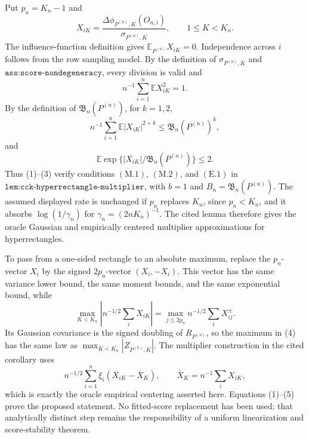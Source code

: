 Put \(p_n=K_n-1\) and
\[
 X_{iK}=\frac{\Delta\phi_{P^{(n)},K}(O_{n,i})}{\sigma_{P^{(n)},K}},
 \qquad 1\leq K<K_n.
\]
The influence-function definition gives \(\mathbb E_{P^{(n)}}X_{iK}=0\).  Independence across \(i\) follows from the row sampling model.  By the definition of \(\sigma_{P^{(n)},K}\) and 
\(\texttt{ass:score-nondegeneracy}\), every division is valid and
\[
 n^{-1}\sum_{i=1}^n\mathbb E X_{iK}^2=1.                                      \tag{1}
\]
By the definition of \(\mathfrak B_n(P^{(n)})\), for \(k=1,2\),
\[
 n^{-1}\sum_{i=1}^n\mathbb E|X_{iK}|^{2+k}
 \leq \mathfrak B_n(P^{(n)})^k,                                               \tag{2}
\]
and
\[
 \mathbb E\exp\{|X_{iK}|/\mathfrak B_n(P^{(n)})\}\leq2.                     \tag{3}
\]
Thus (1)--(3) verify conditions \(\mathrm{(M.1)}\), \(\mathrm{(M.2)}\), and \(\mathrm{(E.1)}\) in \(\texttt{lem:cck-hyperrectangle-multiplier}\), with \(b=1\) and \(B_n=\mathfrak B_n(P^{(n)})\).  The assumed displayed rate is unchanged if \(p_n\) replaces \(K_n\), since \(p_n<K_n\), and it absorbs \(\log(1/\gamma_n)\) for \(\gamma_n=(2nK_n)^{-1}\).  The cited lemma therefore gives the oracle Gaussian and empirically centered multiplier approximations for hyperrectangles.

To pass from a one-sided rectangle to an absolute maximum, replace the \(p_n\)-vector \(X_i\) by the signed \(2p_n\)-vector \((X_i,-X_i)\).  This vector has the same variance lower bound, the same moment bounds, and the same exponential bound, while
\[
 \max_{K<K_n}\left|n^{-1/2}\sum_iX_{iK}\right|
 =\max_{j\leq2p_n}n^{-1/2}\sum_iX_{ij}^{\pm}.                             \tag{4}
\]
Its Gaussian covariance is the signed doubling of \(R_{P^{(n)}}\), so the maximum in (4) has the same law as \(\max_{K<K_n}|Z_{P^{(n)},K}|\).  The multiplier construction in the cited corollary uses
\[
 n^{-1/2}\sum_{i=1}^n\xi_i(X_{iK}-\overline X_K),
 \qquad \overline X_K=n^{-1}\sum_iX_{iK},                                \tag{5}
\]
which is exactly the oracle empirical centering asserted here.  Equations (1)--(5) prove the proposed statement.  No fitted-score replacement has been used; that analytically distinct step remains the responsibility of a uniform linearization and score-stability theorem.